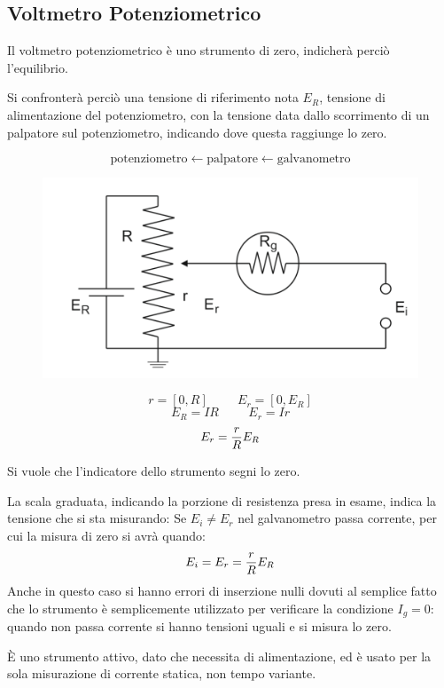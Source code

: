 \documentclass[a4paper, 15pt]{article}
\begin{document}
\subsection{Voltmetro Potenziometrico}	
\begin{adjustwidth}{2in}{}		
		Il voltmetro potenziometrico è uno strumento di zero, indicherà perciò l'equilibrio.
		
		Si confronterà perciò una tensione di riferimento nota $E_R$, tensione di alimentazione del potenziometro, con la tensione data dallo scorrimento di un palpatore sul potenziometro, indicando dove questa raggiunge lo zero. 
		
		\[\boxed{\text{potenziometro}}\leftarrow \boxed{\text{palpatore}} \leftarrow \boxed{\text{galvanometro}}\]
\begin{figure}[H]
	\centering
	\includegraphics[width=0.5\linewidth]{fig/screenshot009}
	\label{fig:screenshot009}
\end{figure}
		\[r = [0, R] \hspace{1cm} E_r = [0, E_R]\]
		\[E_R = IR \hspace{1cm} E_r = Ir\]
		\[E_r = {r\over R}E_R\]

		Si vuole che l'indicatore dello strumento segni lo zero. 
		
		La scala graduata, indicando la porzione di resistenza presa in esame, indica la tensione che si sta misurando: Se $ E_i \ne E_r $ nel galvanometro passa corrente, per cui la misura di zero si avrà quando:
		\[E_i = E_r = {r\over R}E_R\]  
		Anche in questo caso si hanno errori di inserzione nulli dovuti al semplice fatto che lo strumento è semplicemente utilizzato per verificare la condizione $I_g = 0$: quando non passa corrente si hanno tensioni uguali e si misura lo zero. \newline 
		
		È uno strumento attivo, dato che necessita di alimentazione, ed è usato per la sola misurazione di corrente statica, non tempo variante.
\end{adjustwidth}
\newpage		
\end{document}

